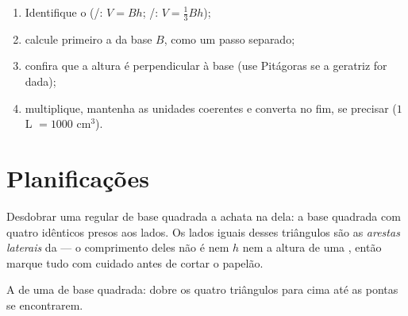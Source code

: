 \begin{method}\label{met:g8:solids:method}
\begin{enumerate}
  \item Identifique o  (/: $V = Bh$;
        /: $V = \frac13 Bh$);
  \item calcule primeiro a  da base $B$, como um passo separado;
  \item confira que a altura é perpendicular à base (use Pitágoras se
        a geratriz for dada);
  \item multiplique, mantenha as unidades coerentes e converta no fim,
        se precisar ($1$ L $= 1000$ cm$^3$).
\end{enumerate}
\end{method}

\section{Planificações}

\begin{example}\label{ex:g8:solids:net}
Desdobrar uma  regular de base quadrada a achata na
\emph{} dela: a base quadrada com quatro  idênticos presos aos lados. Os lados iguais desses
triângulos são as \emph{arestas laterais} da  --- o
comprimento deles não é nem $h$ nem a altura de uma , então marque
tudo com cuidado antes de cortar o papelão.
\end{example}

\begin{omfigure}

{\small A  de uma  de base quadrada: dobre os
quatro triângulos para cima até as pontas se encontrarem.}
\end{omfigure}

